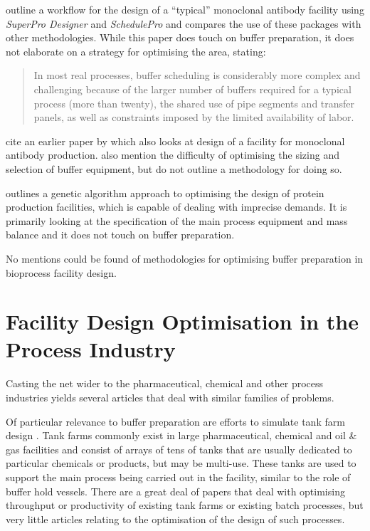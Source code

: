 \citet{Petrides:2014} outline a workflow for 
the design of a ``typical'' monoclonal antibody facility using 
\emph{SuperPro Designer\textsuperscript{\textregistered}} and
\emph{SchedulePro\textsuperscript{\textregistered}} and compares the use of
these packages with other methodologies.
While this paper does touch on buffer preparation,
it does not elaborate on a strategy for optimising the area, stating:
\begin{quote}In most real processes, buffer scheduling is considerably more
complex and challenging because of the larger number of buffers required for a
typical process (more than twenty), the shared use of pipe segments and transfer
panels, as well as constraints imposed by the limited availability of labor.
\end{quote}
\citet{Petrides:2014} cite an earlier paper by \citet{Toumi:2010} which also
looks at design of a facility for monoclonal antibody production.
\citet{Toumi:2010} also mention the difficulty of optimising the sizing and 
selection of buffer equipment, but do not outline a methodology for doing so.

\citet{Dietz:2008} outlines a genetic algorithm approach to optimising the 
design of protein production facilities, which is capable of dealing with
imprecise demands.  It is primarily looking at the specification of the main
process equipment and mass balance and it does not touch on buffer preparation.

No mentions could be found of methodologies for optimising buffer preparation in
bioprocess facility design.

\section{Facility Design Optimisation in the Process Industry}
\label{SS.fdopi}
Casting the net wider to the pharmaceutical, chemical and other process
industries yields several articles that deal with similar families of problems.

Of particular relevance to buffer preparation are efforts to simulate tank farm
design \citep{Al-Otaibi:2004, Stewart:2005, Sharda:2009, Terrazas-Moreno:2012}.
Tank farms commonly exist in large pharmaceutical, chemical and oil \&
gas facilities and consist of arrays of tens of tanks that are usually dedicated
to particular chemicals or products, but may be multi-use.  These tanks are used
to support the main process being carried out in the facility, similar to the
role of buffer hold vessels.  There are a great deal of papers that deal with
optimising throughput or productivity of existing tank farms or existing batch
processes, but very little articles relating to the optimisation of the design
of such processes.

